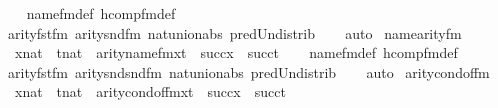 \begin{isabellebody}
%
\isadelimproof
\ \ %
\endisadelimproof
%
\isatagproof
{}\isamarkupfalse%
\ name{}{\isacharunderscore}{\kern0pt}fm{\isacharunderscore}{\kern0pt}def\ hcomp{\isacharunderscore}{\kern0pt}fm{\isacharunderscore}{\kern0pt}def\isanewline
\ \ \isamarkupfalse%
\ arity{\isacharunderscore}{\kern0pt}fst{\isacharunderscore}{\kern0pt}fm\ arity{\isacharunderscore}{\kern0pt}snd{\isacharunderscore}{\kern0pt}fm\ nat{\isacharunderscore}{\kern0pt}union{\isacharunderscore}{\kern0pt}abs{}\ pred{\isacharunderscore}{\kern0pt}Un{\isacharunderscore}{\kern0pt}distrib\isanewline
\ \ \isamarkupfalse%
\ auto%
\endisatagproof
{\isafoldproof}%
%
\isadelimproof
\isanewline
%
\endisadelimproof
\isanewline
{}\isamarkupfalse%
\ name{}arity{\isacharunderscore}{\kern0pt}{\isacharunderscore}{\kern0pt}fm\ {\isacharcolon}{\kern0pt}\isanewline
\ \ {\isachardoublequoteopen}{\isasymlbrakk}x{\isasymin}nat\ {\isacharsemicolon}{\kern0pt}\ t{\isasymin}nat{\isasymrbrakk}\ {\isasymLongrightarrow}\ arity{\isacharparenleft}{\kern0pt}name{}{\isacharunderscore}{\kern0pt}fm{\isacharparenleft}{\kern0pt}x{\isacharcomma}{\kern0pt}t{\isacharparenright}{\kern0pt}{\isacharparenright}{\kern0pt}\ {\isacharequal}{\kern0pt}\ succ{\isacharparenleft}{\kern0pt}x{\isacharparenright}{\kern0pt}\ {\isasymunion}\ succ{\isacharparenleft}{\kern0pt}t{\isacharparenright}{\kern0pt}{\isachardoublequoteclose}\isanewline
%
\isadelimproof
\ \ %
\endisadelimproof
%
\isatagproof
{}\isamarkupfalse%
\ name{}{\isacharunderscore}{\kern0pt}fm{\isacharunderscore}{\kern0pt}def\ hcomp{\isacharunderscore}{\kern0pt}fm{\isacharunderscore}{\kern0pt}def\isanewline
\ \ \isamarkupfalse%
\ arity{\isacharunderscore}{\kern0pt}fst{\isacharunderscore}{\kern0pt}fm\ arity{\isacharunderscore}{\kern0pt}snd{\isacharunderscore}{\kern0pt}snd{\isacharunderscore}{\kern0pt}fm\ nat{\isacharunderscore}{\kern0pt}union{\isacharunderscore}{\kern0pt}abs{}\ pred{\isacharunderscore}{\kern0pt}Un{\isacharunderscore}{\kern0pt}distrib\isanewline
\ \ \isamarkupfalse%
\ auto%
\endisatagproof
{\isafoldproof}%
%
\isadelimproof
\isanewline
%
\endisadelimproof
\isanewline
{}\isamarkupfalse%
\ arity{\isacharunderscore}{\kern0pt}cond{\isacharunderscore}{\kern0pt}of{\isacharunderscore}{\kern0pt}fm\ {\isacharcolon}{\kern0pt}\isanewline
\ \ {\isachardoublequoteopen}{\isasymlbrakk}x{\isasymin}nat\ {\isacharsemicolon}{\kern0pt}\ t{\isasymin}nat{\isasymrbrakk}\ {\isasymLongrightarrow}\ arity{\isacharparenleft}{\kern0pt}cond{\isacharunderscore}{\kern0pt}of{\isacharunderscore}{\kern0pt}fm{\isacharparenleft}{\kern0pt}x{\isacharcomma}{\kern0pt}t{\isacharparenright}{\kern0pt}{\isacharparenright}{\kern0pt}\ {\isacharequal}{\kern0pt}\ succ{\isacharparenleft}{\kern0pt}x{\isacharparenright}{\kern0pt}\ {\isasymunion}\ succ{\isacharparenleft}{\kern0pt}t{\isacharparenright}{\kern0pt}{\isachardoublequoteclose}\isanewline

\end{isabellebody}
